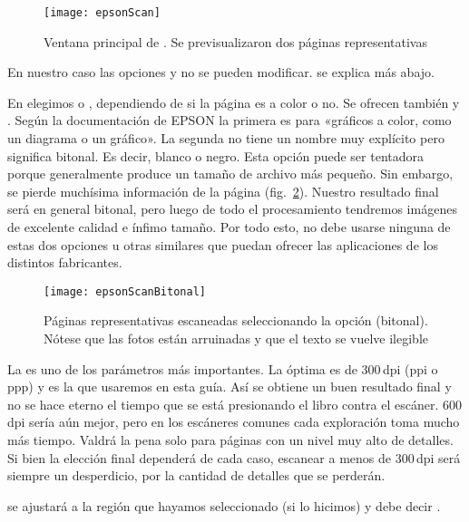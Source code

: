\documentclass[%
	a5paper,
	10pt,
	twoside,
	openright,
	final,
]{memoir}
\begin{document}
{	\begin{figure}
		\texttt{[image: epsonScan]}
		\caption[Ventana principal de \epsonscan]{Ventana principal de \epsonscan. Se previsualizaron dos páginas representativas\label{fig:epsonScan}}
	\end{figure}

	En nuestro caso las opciones  y  no se pueden modificar.  se explica más abajo.

	En  elegimos  o , dependiendo de si la página es a color o no. Se ofrecen también  y . Según la documentación de EPSON la primera es para «gráficos a color, como un diagrama o un gráfico». La segunda no tiene un nombre muy explícito pero significa bitonal. Es decir, blanco o negro. Esta opción puede ser tentadora porque generalmente produce un tamaño de archivo más pequeño. Sin embargo, se pierde muchísima información de la página (fig.~\ref{fig:epsonScanBitonal}). Nuestro resultado final será en general bitonal, pero luego de todo el procesamiento tendremos imágenes de excelente calidad e ínfimo tamaño. Por todo esto, no debe usarse ninguna de estas dos opciones u otras similares que puedan ofrecer las aplicaciones de los distintos fabricantes.

	\begin{figure}
		\texttt{[image: epsonScanBitonal]}
		\caption[Páginas representativas escaneadas en bitonal]{Páginas representativas escaneadas seleccionando la opción  (bitonal). Nótese que las fotos están arruinadas y que el texto se vuelve ilegible\label{fig:epsonScanBitonal}}
	\end{figure}

	La  es uno de los parámetros más importantes. La óptima es de 300\,dpi (ppi o ppp) y es la que usaremos en esta guía. Así se obtiene un buen resultado final y no se hace eterno el tiempo que se está presionando el libro contra el escáner. 600\,dpi sería aún mejor, pero en los escáneres comunes cada exploración toma mucho más tiempo. Valdrá la pena solo para páginas con un nivel muy alto de detalles. Si bien la elección final dependerá de cada caso, escanear a menos de 300\,dpi será siempre un desperdicio, por la cantidad de detalles que se perderán.

	 se ajustará a la región que hayamos seleccionado (si lo hicimos) y  debe decir .

}
\end{document}
